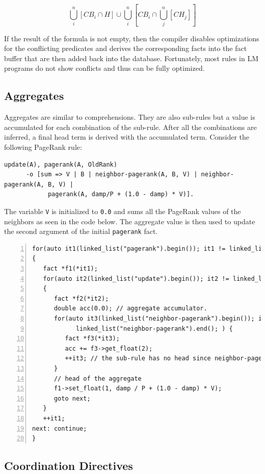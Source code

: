 \[
\bigcup^{n}_i[CB_i \cap H] \cup \bigcup^{n}_i [CB_i \cap \bigcup^{n}_j[CH_j]]
\]

If the result of the formula is not empty, then the compiler disables
optimizations for the conflicting predicates and derives the corresponding facts
into the fact buffer that are then added back into the database.
Fortunately, most rules in LM programs do not show conflicts and thus
can be fully optimized.

\subsection{Aggregates}

Aggregates are similar to comprehensions. They are also sub-rules but a value is
accumulated for each combination of the sub-rule. After all the combinations are
inferred, a final head term is derived with the accumulated term. Consider the following
PageRank rule:

\begin{Verbatim}[fontsize=\footnotesize]
update(A), pagerank(A, OldRank)
      -o [sum => V | B | neighbor-pagerank(A, B, V) | neighbor-pagerank(A, B, V) |
            pagerank(A, damp/P + (1.0 - damp) * V)].
\end{Verbatim}

The variable \texttt{V} is initialized to \texttt{0.0} and sums all
the PageRank values of the neighbors as seen in the code below. The aggregate
value is then used to update the second argument of the initial
\texttt{pagerank} fact.

\begin{Verbatim}[numbers=left,fontsize=\scriptsize]
for(auto it1(linked_list("pagerank").begin()); it1 != linked_list("pagerank").end(); )
{
   fact *f1(*it1);
   for(auto it2(linked_list("update").begin()); it2 != linked_list("update").end(); )
   {
      fact *f2(*it2);
      double acc(0.0); // aggregate accumulator.
      for(auto it3(linked_list("neighbor-pagerank").begin()); it3 !=
            linked_list("neighbor-pagerank").end(); ) {
         fact *f3(*it3);
         acc += f3->get_float(2);
         ++it3; // the sub-rule has no head since neighbor-pagerank is re-derived
      }
      // head of the aggregate
      f1->set_float(1, damp / P + (1.0 - damp) * V);
      goto next;
   }
   ++it1;
next: continue;
}
\end{Verbatim}

\subsection{Coordination Directives}

